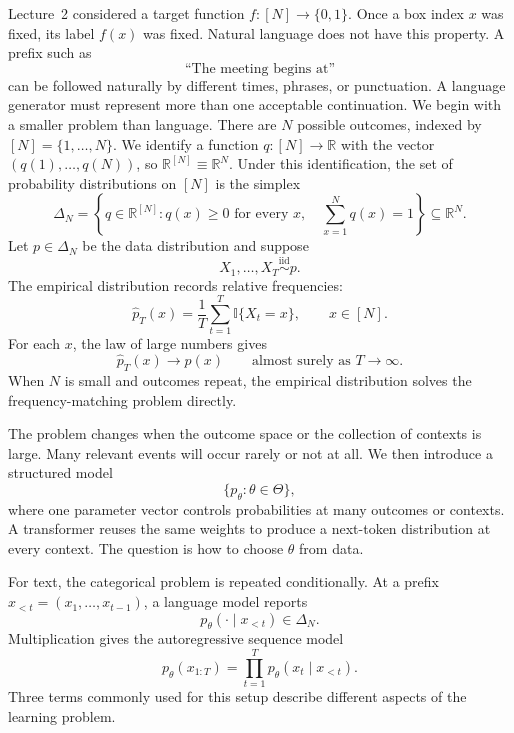 \documentclass[11pt,twoside]{article}
\newcommand{\I}{\mathbb I}
\newcommand{\R}{\mathbb R}
\theoremstyle{definition}
\theoremstyle{remark}
\begin{document}
Lecture~2 considered a target function $f:[N]\to\{0,1\}$. Once a box index
$x$ was fixed, its label $f(x)$ was fixed. Natural language does not have this
property. A prefix such as
\[
  \text{``The meeting begins at''}
\]
can be followed naturally by different times, phrases, or punctuation. A
language generator must represent more than one acceptable continuation.
We begin with a smaller problem than language. There are $N$ possible outcomes,
indexed by $[N]=\{1,\ldots,N\}$. We identify a function
$q:[N]\to\R$ with the vector $(q(1),\ldots,q(N))$, so
$\R^{[N]}\equiv\R^N$. Under this identification, the set of probability
distributions on $[N]$ is the simplex
\begin{equation}
\Delta_N
=\left\{q\in\R^{[N]}:q(x)\ge0\text{ for every }x,
\quad \sum_{x=1}^N q(x)=1\right\}
\subseteq\R^N.
\label{eq:simplex}
\end{equation}
Let $p\in\Delta_N$ be the data distribution and suppose
\begin{equation}
X_1,\ldots,X_T\overset{\mathrm{iid}}{\sim}p.
\label{eq:iid-categorical}
\end{equation}
The empirical distribution records relative frequencies:
\begin{equation}
\widehat p_T(x)
=\frac1T\sum_{t=1}^T\I\{X_t=x\},
\qquad x\in[N].
\label{eq:empirical-distribution}
\end{equation}
For each $x$, the law of large numbers gives
\begin{equation}
\widehat p_T(x)\longrightarrow p(x)
\qquad\text{almost surely as }T\to\infty.
\label{eq:frequency-matching}
\end{equation}
When $N$ is small and outcomes repeat, the empirical distribution solves the
frequency-matching problem directly.

The problem changes when the outcome space or the collection of contexts is
large. Many relevant events will occur rarely or not at all. We then introduce
a structured model
\begin{equation}
\{p_\theta:\theta\in\Theta\},
\label{eq:parametric-model}
\end{equation}
where one parameter vector controls probabilities at many outcomes or
contexts. A transformer reuses the same weights to produce a next-token
distribution at every context. The question is how to choose $\theta$ from
data.

For text, the categorical problem is repeated conditionally. At a prefix
$x_{<t}=(x_1,\ldots,x_{t-1})$, a language model reports
\[
p_\theta(\cdot\mid x_{<t})\in\Delta_N.
\]
Multiplication gives the autoregressive sequence model
\begin{equation}
p_\theta(x_{1:T})
=\prod_{t=1}^T p_\theta(x_t\mid x_{<t}).
\label{eq:autoregressive-factorization}
\end{equation}
Three terms commonly used for this setup describe different aspects of the
learning problem.
\end{document}
